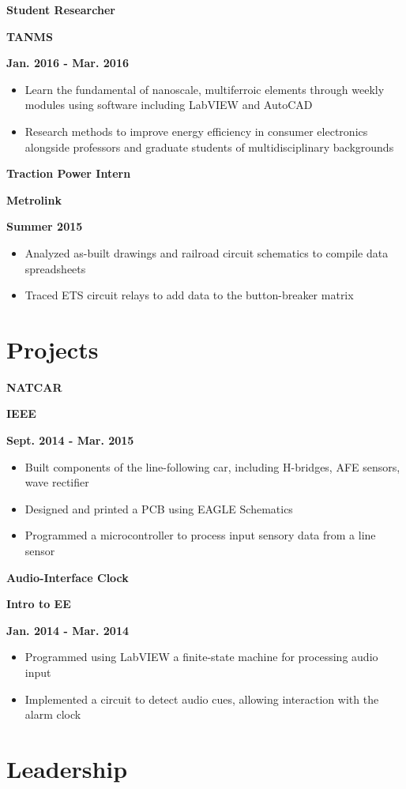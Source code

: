 \documentclass[12pt]{article}
\newcommand\textbox[1]{\parbox{.333\textwidth}{#1}}
\newcommand{\textlcr}[3]{\textbox{\textbf{#1}\hfill}\textbox{\hfil \textbf{#2}\hfil}\textbox{\hfill \textbf{#3}}}
\begin{document}
\bigskip
\textlcr{Student Researcher}{TANMS}{Jan. 2016 - Mar. 2016}
\begin{itemize}
\item Learn the fundamental of nanoscale, multiferroic elements through weekly modules using software including LabVIEW and AutoCAD
\item Research methods to improve energy efficiency in consumer electronics alongside professors and graduate students of multidisciplinary backgrounds
\end{itemize}

\bigskip
\textlcr{Traction Power Intern}{Metrolink}{Summer 2015}
\begin{itemize}
\item Analyzed as-built drawings and railroad circuit schematics to compile data spreadsheets
\item Traced ETS circuit relays to add data to the button-breaker matrix
\end{itemize}

\section*{Projects}
\vspace*{-1em}\makebox[\linewidth]{\rule{\textwidth}{0.4pt}}

\textlcr{NATCAR}{IEEE}{Sept. 2014 - Mar. 2015}
\begin{itemize}
\item Built components of the line-following car, including H-bridges, AFE sensors, wave rectifier
\item Designed and printed a PCB using EAGLE Schematics
\item Programmed a microcontroller to process input sensory data from a line sensor
\end{itemize}

\bigskip
\textlcr{Audio-Interface Clock}{Intro to EE}{Jan. 2014 - Mar. 2014}
\begin{itemize}
\item Programmed using LabVIEW a finite-state machine for processing audio input
\item Implemented a circuit to detect audio cues, allowing interaction with the alarm clock
\end{itemize}

\section*{Leadership}
\vspace*{-1em}\makebox[\linewidth]{\rule{\textwidth}{0.4pt}}
\end{document}
